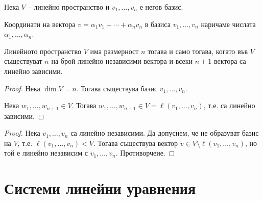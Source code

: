 \begin{definition}
    Нека $V$ -- линейно пространство и $v_1,\dots,v_n$ е негов базис.
    
    Координати на вектора $v = \alpha_1v_1+\cdots+\alpha_nv_n$ в базиса $v_1,\dots,v_n$ наричаме числата $\alpha_1,\dots,\alpha_n$.
\end{definition}

\begin{theorem}
    Линейното пространство $V$ има размерност $n$ тогава и само тогава, когато във $V$ съществуват $n$ на брой линейно независими вектора и всеки $n+1$ вектора са линейно зависими.
    \begin{proof}
        Нека $\dim V = n$. Тогава съществува базис $v_1,\dots,v_n$.

        Нека $w_1,\dots,w_{n+1} \in V$. Тогава $w_1,\dots,w_{n+1} \in V = \ell(v_1,\dots,v_n)$, т.е. са линейно зависими.
    \end{proof}
    \begin{proof}
        Нека $v_1,\dots,v_n$ са линейно независими. Да допуснем, че не образуват базис на $V$, т.е. $\ell(v_1,\dots,v_n) < V$.
        Тогава съществува вектор $v \in V \setminus \ell(v_1,\dots,v_n)$, но той е линейно независим с $v_1,\dots,v_n$. Противорчеие.
    \end{proof}
\end{theorem}

\section{Системи линейни уравнения}
